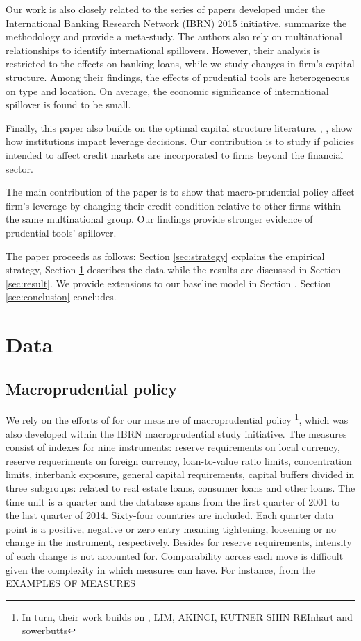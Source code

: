\documentclass[12pt]{article}
\begin{document}
	Our work is also closely related to the series of papers developed under the International Banking Research Network (IBRN) 2015 initiative. \cite*{buch2017cross} summarize the methodology and provide a meta-study. The authors also rely on multinational relationships to identify international spillovers. However, their analysis is restricted to the effects on banking loans, while we study changes in firm's capital structure. Among their findings, the effects of prudential tools are heterogeneous on type and location. On average, the economic significance of international spillover is found to be small.  
	
	Finally, this paper also builds on the optimal capital structure literature. \cite*{demirgucc1998law}, \cite*{beck2004bank}, show how institutions impact leverage decisions. Our contribution is to study if policies intended to affect credit markets are incorporated to firms beyond the financial sector.   
	
   The main contribution of the paper is to show that macro-prudential policy affect firm's leverage by changing their credit condition relative to other firms within the same multinational group. Our findings provide stronger evidence of prudential tools' spillover.
	
	The paper proceeds as follows: Section \ref{sec:strategy} explains the empirical strategy, Section \ref{sec:data} describes the data while the results are discussed in Section \ref{sec:result}. We provide extensions to our baseline model in Section \label{sec:discussion}. Section \ref{sec:conclusion} concludes. 
	
 
	\section{Data} \label{sec:data}	
	\subsection{Macroprudential policy} \label{subsec:MPI}
	
	We rely on the efforts of \cite*{cerutti2017changes} for our measure of macroprudential policy \footnote{In turn, their work builds on \cite*{cerutti2015use}, LIM, AKINCI, KUTNER SHIN REInhart and sowerbutts}, which was also developed within the IBRN macroprudential study initiative. The measures consist of indexes for nine instruments: reserve requirements on local currency, reserve requeriments on foreign currency, loan-to-value ratio limits, concentration limits, interbank exposure, general capital requirements, capital buffers divided in three subgroups: related to real estate loans, consumer loans and other loans. The time unit is a quarter and the database spans from the first quarter of 2001 to the last quarter of 2014. Sixty-four countries are included. Each quarter data point is a positive, negative or zero entry meaning tightening, loosening or no change in the instrument, respectively. Besides for reserve requirements, intensity of each change is not accounted for. Comparability across each move is difficult given the complexity in which measures can have. For instance, from the EXAMPLES OF MEASURES
\end{document}

